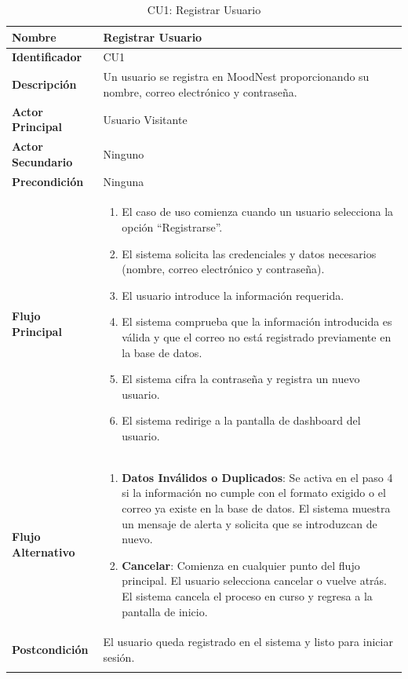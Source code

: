 \begin{xltabular}{\textwidth}{|>{\bfseries}p{3.5cm}|X|}
    Nombre & Registrar Usuario \\ \hline
    Identificador & CU1 \\ \hline
    Descripción & Un usuario se registra en MoodNest proporcionando su nombre, correo electrónico y contraseña. \\ \hline
    Actor Principal & Usuario Visitante \\ \hline
    Actor Secundario & Ninguno \\ \hline
    Precondición & Ninguna \\ \hline
    Flujo Principal & 
    \begin{enumerate}[leftmargin=0.5cm, topsep=0pt, partopsep=0pt, parsep=0pt, itemsep=4pt]
        \item El caso de uso comienza cuando un usuario selecciona la opción ``Registrarse''.
        \item El sistema solicita las credenciales y datos necesarios (nombre, correo electrónico y contraseña).
        \item El usuario introduce la información requerida.
        \item El sistema comprueba que la información introducida es válida y que el correo no está registrado previamente en la base de datos.
        \item El sistema cifra la contraseña y registra un nuevo usuario.
        \item El sistema redirige a la pantalla de dashboard del usuario.
    \end{enumerate} 
    \\ \hline
    Flujo Alternativo & 
    \begin{enumerate}[leftmargin=0.5cm, topsep=0pt, partopsep=0pt, parsep=0pt, itemsep=4pt]
        \item \textbf{Datos Inválidos o Duplicados}: Se activa en el paso 4 si la información no cumple con el formato exigido o el correo ya existe en la base de datos. El sistema muestra un mensaje de alerta y solicita que se introduzcan de nuevo.
        \item \textbf{Cancelar}: Comienza en cualquier punto del flujo principal. El usuario selecciona cancelar o vuelve atrás. El sistema cancela el proceso en curso y regresa a la pantalla de inicio.
    \end{enumerate}
    \\ \hline
    Postcondición & El usuario queda registrado en el sistema y listo para iniciar sesión. \\ \hline
    \caption{CU1: Registrar Usuario}
    \label{tab:esp_cu1} \\
\end{xltabular}
\endgroup


